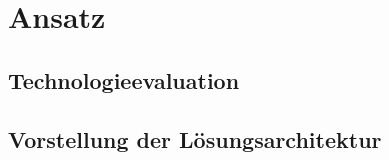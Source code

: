 \chapter{Ansatz}
\label{Ansatz}


\section{Technologieevaluation}

\section{Vorstellung der Lösungsarchitektur}


